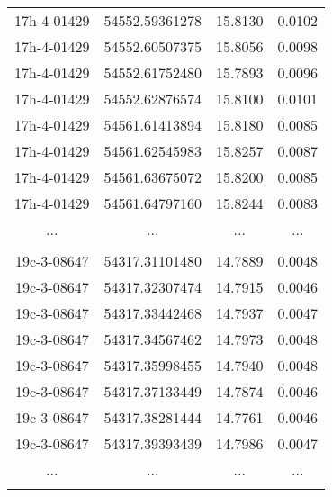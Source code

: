 \documentclass[fleqn,usenatbib]{mnras}
\begin{document}
\begin{table}
\begin{center}
\begin{tabular}{cccc}
17h-4-01429 & 54552.59361278 & 15.8130 & 0.0102 \\
17h-4-01429 & 54552.60507375 & 15.8056 & 0.0098 \\
17h-4-01429 & 54552.61752480 & 15.7893 & 0.0096 \\
17h-4-01429 & 54552.62876574 & 15.8100 & 0.0101 \\
17h-4-01429 & 54561.61413894 & 15.8180 & 0.0085 \\
17h-4-01429 & 54561.62545983 & 15.8257 & 0.0087 \\
17h-4-01429 & 54561.63675072 & 15.8200 & 0.0085 \\
17h-4-01429 & 54561.64797160 & 15.8244 & 0.0083 \\
... & ... & ... & ... \\
\\  [-1ex]

19c-3-08647 & 54317.31101480 & 14.7889 & 0.0048 \\
19c-3-08647 & 54317.32307474 & 14.7915 & 0.0046 \\
19c-3-08647 & 54317.33442468 & 14.7937 & 0.0047 \\
19c-3-08647 & 54317.34567462 & 14.7973 & 0.0048 \\
19c-3-08647 & 54317.35998455 & 14.7940 & 0.0048 \\
19c-3-08647 & 54317.37133449 & 14.7874 & 0.0046 \\
19c-3-08647 & 54317.38281444 & 14.7761 & 0.0046 \\
19c-3-08647 & 54317.39393439 & 14.7986 & 0.0047 \\
... & ... & ... & ... \\
\\  [-1ex]


\end{tabular}
\end{center}
\end{table}
\end{document}
